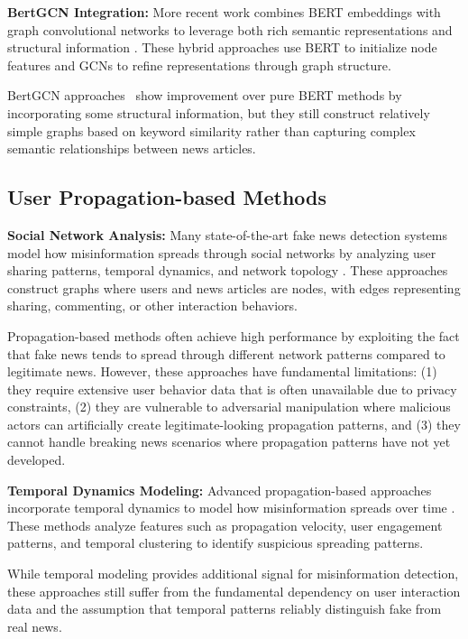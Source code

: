 \textbf{BertGCN Integration:} More recent work combines BERT embeddings with graph convolutional networks to leverage both rich semantic representations and structural information \cite{lin2021bertgcn}. These hybrid approaches use BERT to initialize node features and GCNs to refine representations through graph structure.

BertGCN approaches~\cite{lin2021bertgcn} show improvement over pure BERT methods by incorporating some structural information, but they still construct relatively simple graphs based on keyword similarity rather than capturing complex semantic relationships between news articles.

\subsection{User Propagation-based Methods}

\textbf{Social Network Analysis:} Many state-of-the-art fake news detection systems model how misinformation spreads through social networks by analyzing user sharing patterns, temporal dynamics, and network topology \cite{shu2017fake, zhou2020survey}. These approaches construct graphs where users and news articles are nodes, with edges representing sharing, commenting, or other interaction behaviors.

Propagation-based methods often achieve high performance by exploiting the fact that fake news tends to spread through different network patterns compared to legitimate news. However, these approaches have fundamental limitations: (1) they require extensive user behavior data that is often unavailable due to privacy constraints, (2) they are vulnerable to adversarial manipulation where malicious actors can artificially create legitimate-looking propagation patterns, and (3) they cannot handle breaking news scenarios where propagation patterns have not yet developed.

\textbf{Temporal Dynamics Modeling:} Advanced propagation-based approaches incorporate temporal dynamics to model how misinformation spreads over time \cite{ma2016detecting, liu2018early}. These methods analyze features such as propagation velocity, user engagement patterns, and temporal clustering to identify suspicious spreading patterns.

While temporal modeling provides additional signal for misinformation detection, these approaches still suffer from the fundamental dependency on user interaction data and the assumption that temporal patterns reliably distinguish fake from real news.

